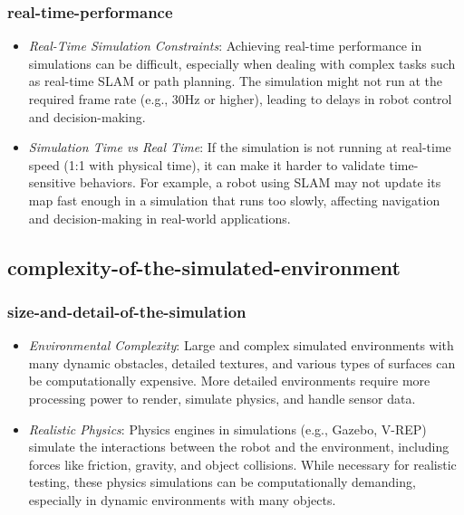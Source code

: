 \documentclass[../../main]{subfiles}
\begin{document}
    \subsubsection{real-time-performance}
    
    \begin{itemize}
    \item
      \emph{Real-Time Simulation Constraints}: Achieving real-time
      performance in simulations can be difficult, especially when dealing
      with complex tasks such as real-time SLAM or path planning. The
      simulation might not run at the required frame rate (e.g., 30Hz or
      higher), leading to delays in robot control and decision-making.
    \item
      \emph{Simulation Time vs Real Time}: If the simulation is not
      running at real-time speed (1:1 with physical time), it can make it
      harder to validate time-sensitive behaviors. For example, a robot
      using SLAM may not update its map fast enough in a simulation that
      runs too slowly, affecting navigation and decision-making in
      real-world applications.
    \end{itemize}
    
    \subsection{complexity-of-the-simulated-environment}

    \subsubsection{size-and-detail-of-the-simulation}    
    \begin{itemize}
    \item
      \emph{Environmental Complexity}: Large and complex simulated
      environments with many dynamic obstacles, detailed textures, and
      various types of surfaces can be computationally expensive. More
      detailed environments require more processing power to render,
      simulate physics, and handle sensor data.
    \item
      \emph{Realistic Physics}: Physics engines in simulations (e.g.,
      Gazebo, V-REP) simulate the interactions between the robot and the
      environment, including forces like friction, gravity, and object
      collisions. While necessary for realistic testing, these physics
      simulations can be computationally demanding, especially in dynamic
      environments with many objects.
    \end{itemize}
    
\end{document}
